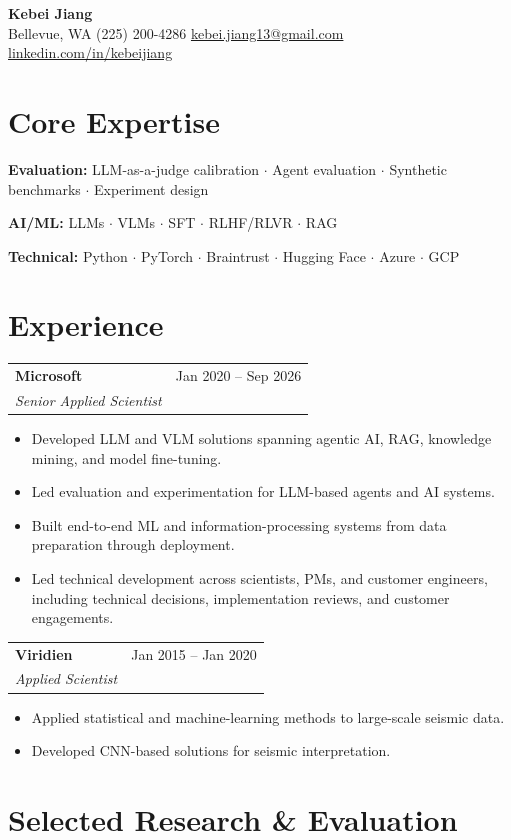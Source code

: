 \documentclass[10pt,letterpaper]{article}
\makeatletter
\newcommand{\resumeSubheading}[4]{%
\vspace{1pt}
\begin{tabularx}{\textwidth}{@{}Xr@{}}
\textbf{#1} & #2 \\
\textit{#3} & \textit{#4}
\end{tabularx}
\vspace{-3pt}}
\makeatother
\begin{document}
\begin{center}
{\LARGE\bfseries Kebei Jiang}\\[3pt]
Bellevue, WA \textbar{} (225) 200-4286 \textbar{}
\href{mailto:kebei.jiang13@gmail.com}{kebei.jiang13@gmail.com} \textbar{}
\href{https://www.linkedin.com/in/kebeijiang}{linkedin.com/in/kebeijiang}
\end{center}

\section{Core Expertise}
\textbf{Evaluation:} LLM-as-a-judge calibration $\cdot$ Agent evaluation $\cdot$ Synthetic benchmarks $\cdot$ Experiment design

\textbf{AI/ML:} LLMs $\cdot$ VLMs $\cdot$ SFT $\cdot$ RLHF/RLVR $\cdot$ RAG

\textbf{Technical:} Python $\cdot$ PyTorch $\cdot$ Braintrust $\cdot$ Hugging Face $\cdot$ Azure $\cdot$ GCP

\section{Experience}

\resumeSubheading{Microsoft}{Jan 2020 -- Sep 2026}{Senior Applied Scientist}{}
\begin{itemize}
\item Developed LLM and VLM solutions spanning agentic AI, RAG, knowledge mining, and model fine-tuning.
\item Led evaluation and experimentation for LLM-based agents and AI systems.
\item Built end-to-end ML and information-processing systems from data preparation through deployment.
\item Led technical development across scientists, PMs, and customer engineers, including technical decisions, implementation reviews, and customer engagements.
\end{itemize}

\resumeSubheading{Viridien}{Jan 2015 -- Jan 2020}{Applied Scientist}{}
\begin{itemize}
\item Applied statistical and machine-learning methods to large-scale seismic data.
\item Developed CNN-based solutions for seismic interpretation.
\end{itemize}

\section{Selected Research \& Evaluation}
\end{document}

